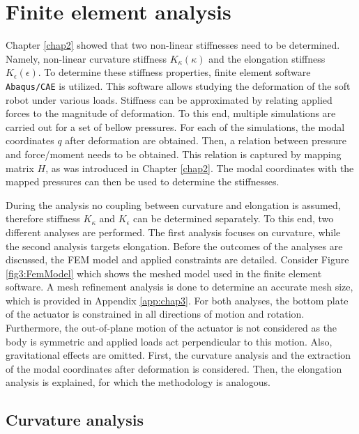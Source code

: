 
\section{Finite element analysis}


Chapter \ref{chap2} showed that two non-linear stiffnesses need to be determined. Namely, non-linear curvature stiffness $K_\kappa(\kappa)$ and the elongation stiffness $K_\epsilon(\epsilon)$. To determine these stiffness properties, finite element software \verb+Abaqus/CAE+ is utilized. This software allows studying the deformation of the soft robot under various loads. Stiffness can be approximated by relating applied forces to the magnitude of deformation. To this end, multiple simulations are carried out for a set of bellow pressures. For each of the simulations, the modal coordinates $q$ after deformation are obtained. Then, a relation between pressure and force/moment needs to be obtained. This relation is captured by mapping matrix $H$, as was introduced in Chapter \ref{chap2}. The modal coordinates with the mapped pressures can then be used to determine the stiffnesses.

During the analysis no coupling between curvature and elongation is assumed, therefore stiffness $K_\kappa$ and $K_\epsilon$ can be determined separately. To this end, two different analyses are performed. The first analysis focuses on curvature, while the second analysis targets elongation. Before the outcomes of the analyses are discussed, the FEM model and applied constraints are detailed. Consider Figure \ref{fig3:FemModel} which shows the meshed model used in the finite element software. A mesh refinement analysis is done to determine an accurate mesh size, which is provided in Appendix \ref{app:chap3}. For both analyses, the bottom plate of the actuator is constrained in all directions of motion and rotation. Furthermore, the out-of-plane motion of the actuator is not considered as the body is symmetric and applied loads act perpendicular to this motion. Also, gravitational effects are omitted. First, the curvature analysis and the extraction of the modal coordinates after deformation is considered. Then, the elongation analysis is explained, for which the methodology is analogous. 


\subsection{Curvature analysis}

